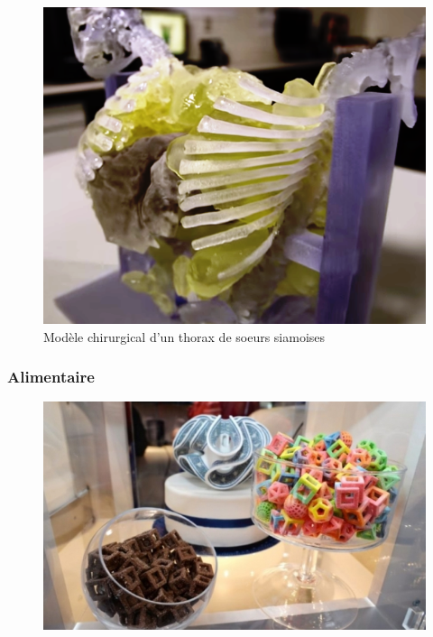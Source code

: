 \documentclass{article}
\begin{document}
\begin{figure}[h!]
\centering
\includegraphics[scale=0.4]{./images/Modele-chirurgical.png}
\caption{Modèle chirurgical d'un thorax de soeurs siamoises}
\end{figure}
\newpage

\subsubsection{Alimentaire}
\begin{figure}[h!]
\centering
\includegraphics[scale=0.4]{./images/bonbons.png}
\end{figure}\hfill
\end{document}
